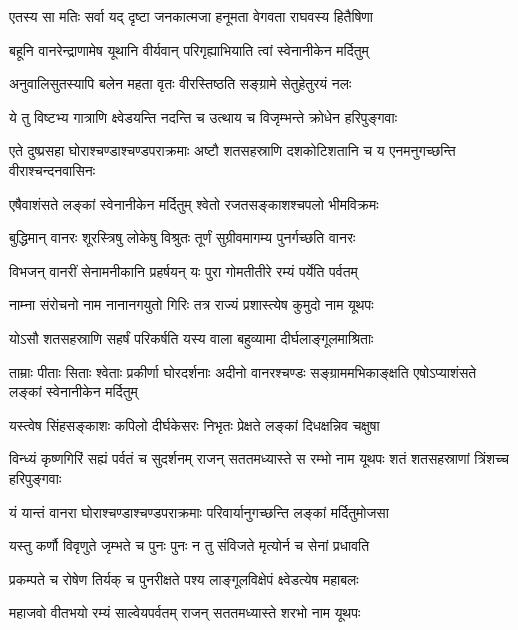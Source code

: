\twolineshloka
{एतस्य सा मतिः सर्वा यद् दृष्टा जनकात्मजा}
{हनूमता वेगवता राघवस्य हितैषिणा} %

\twolineshloka
{बहूनि वानरेन्द्राणामेष यूथानि वीर्यवान्}
{परिगृह्याभियाति त्वां स्वेनानीकेन मर्दितुम्} %

\twolineshloka
{अनुवालिसुतस्यापि बलेन महता वृतः}
{वीरस्तिष्ठति सङ्ग्रामे सेतुहेतुरयं नलः} %

\twolineshloka
{ये तु विष्टभ्य गात्राणि क्ष्वेडयन्ति नदन्ति च}
{उत्थाय च विजृम्भन्ते क्रोधेन हरिपुङ्गवाः} %

\threelineshloka
{एते दुष्प्रसहा घोराश्चण्डाश्चण्डपराक्रमाः}
{अष्टौ शतसहस्राणि दशकोटिशतानि च}
{य एनमनुगच्छन्ति वीराश्चन्दनवासिनः} %

\twolineshloka
{एषैवाशंसते लङ्कां स्वेनानीकेन मर्दितुम्}
{श्वेतो रजतसङ्काशश्चपलो भीमविक्रमः} %

\twolineshloka
{बुद्धिमान् वानरः शूरस्त्रिषु लोकेषु विश्रुतः}
{तूर्णं सुग्रीवमागम्य पुनर्गच्छति वानरः} %

\twolineshloka
{विभजन् वानरीं सेनामनीकानि प्रहर्षयन्}
{यः पुरा गोमतीतीरे रम्यं पर्येति पर्वतम्} %

\twolineshloka
{नाम्ना संरोचनो नाम नानानगयुतो गिरिः}
{तत्र राज्यं प्रशास्त्येष कुमुदो नाम यूथपः} %

\twolineshloka
{योऽसौ शतसहस्राणि सहर्षं परिकर्षति}
{यस्य वाला बहुव्यामा दीर्घलाङ्गूलमाश्रिताः} %

\threelineshloka
{ताम्राः पीताः सिताः श्वेताः प्रकीर्णा घोरदर्शनाः}
{अदीनो वानरश्चण्डः सङ्ग्राममभिकाङ्क्षति}
{एषोऽप्याशंसते लङ्कां स्वेनानीकेन मर्दितुम्} %

\twolineshloka
{यस्त्वेष सिंहसङ्काशः कपिलो दीर्घकेसरः}
{निभृतः प्रेक्षते लङ्कां दिधक्षन्निव चक्षुषा} %

\threelineshloka
{विन्ध्यं कृष्णगिरिं सह्यं पर्वतं च सुदर्शनम्}
{राजन् सततमध्यास्ते स रम्भो नाम यूथपः}
{शतं शतसहस्राणां त्रिंशच्च हरिपुङ्गवाः} %

\twolineshloka
{यं यान्तं वानरा घोराश्चण्डाश्चण्डपराक्रमाः}
{परिवार्यानुगच्छन्ति लङ्कां मर्दितुमोजसा} %

\twolineshloka
{यस्तु कर्णौ विवृणुते जृम्भते च पुनः पुनः}
{न तु संविजते मृत्योर्न च सेनां प्रधावति} %

\twolineshloka
{प्रकम्पते च रोषेण तिर्यक् च पुनरीक्षते}
{पश्य लाङ्गूलविक्षेपं क्ष्वेडत्येष महाबलः} %

\twolineshloka
{महाजवो वीतभयो रम्यं साल्वेयपर्वतम्}
{राजन् सततमध्यास्ते शरभो नाम यूथपः} %

